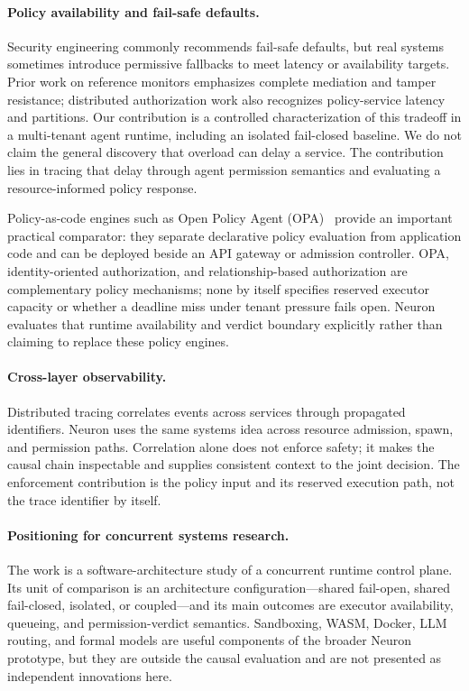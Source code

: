 \paragraph{Policy availability and fail-safe defaults.}
Security engineering commonly recommends fail-safe defaults, but real
systems sometimes introduce permissive fallbacks to meet latency or
availability targets. Prior work on reference monitors emphasizes complete
mediation and tamper resistance; distributed authorization work also
recognizes policy-service latency and partitions. Our contribution is a
controlled characterization of this tradeoff in a multi-tenant agent
runtime, including an isolated fail-closed baseline. We do not claim the
general discovery that overload can delay a service. The contribution lies
in tracing that delay through agent permission semantics and evaluating a
resource-informed policy response.

Policy-as-code engines such as Open Policy Agent (OPA)~\cite{opa2024} provide
an important practical comparator: they separate declarative policy evaluation
from application code and can be deployed beside an API gateway or admission
controller. OPA, identity-oriented authorization, and relationship-based
authorization are complementary policy mechanisms; none by itself specifies
reserved executor capacity or whether a deadline miss under tenant pressure
fails open. Neuron evaluates that runtime availability and verdict boundary
explicitly rather than claiming to replace these policy engines.

\paragraph{Cross-layer observability.}
Distributed tracing correlates events across services through propagated
identifiers. Neuron uses the same systems idea across resource admission,
spawn, and permission paths. Correlation alone does not enforce safety; it
makes the causal chain inspectable and supplies consistent context to the
joint decision. The enforcement contribution is the policy input and its
reserved execution path, not the trace identifier by itself.

\paragraph{Positioning for concurrent systems research.}
The work is a software-architecture study of a concurrent runtime control
plane. Its unit of comparison is an architecture configuration---shared
fail-open, shared fail-closed, isolated, or coupled---and its main outcomes
are executor availability, queueing, and permission-verdict semantics.
Sandboxing, WASM, Docker, LLM routing, and formal models are useful
components of the broader Neuron prototype, but they are outside the causal
evaluation and are not presented as independent innovations here.
